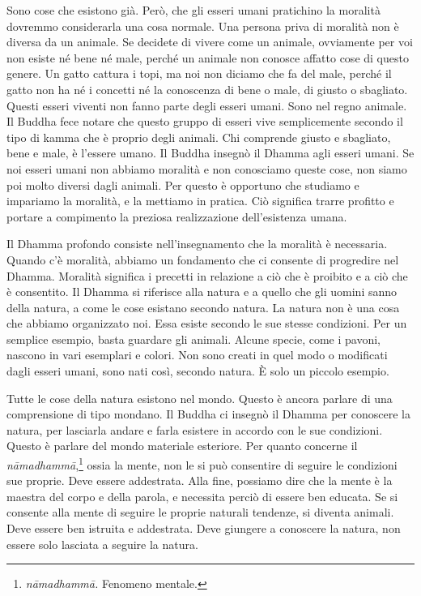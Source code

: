 Sono cose che esistono già. Però, che gli esseri umani pratichino la
moralità dovremmo considerarla una cosa normale. Una persona priva di
moralità non è diversa da un animale. Se decidete di vivere come un
animale, ovviamente per voi non esiste né bene né male, perché un
animale non conosce affatto cose di questo genere. Un gatto cattura i
topi, ma noi non diciamo che fa del male, perché il gatto non ha né i
concetti né la conoscenza di bene o male, di giusto o sbagliato. Questi
esseri viventi non fanno parte degli esseri umani. Sono nel regno
animale. Il Buddha fece notare che questo gruppo di esseri vive
semplicemente secondo il tipo di kamma che è proprio degli
animali. Chi comprende giusto e sbagliato, bene e male, è l'essere
umano. Il Buddha insegnò il Dhamma agli esseri umani. Se noi esseri
umani non abbiamo moralità e non conosciamo queste cose, non siamo poi
molto diversi dagli animali. Per questo è opportuno che studiamo e
impariamo la moralità, e la mettiamo in pratica. Ciò significa trarre
profitto e portare a compimento la preziosa realizzazione dell'esistenza
umana.

Il Dhamma profondo consiste nell'insegnamento che la moralità è
necessaria. Quando c'è moralità, abbiamo un fondamento che ci consente
di progredire nel Dhamma. Moralità significa i precetti in relazione a
ciò che è proibito e a ciò che è consentito. Il Dhamma si riferisce alla
natura e a quello che gli uomini sanno della natura, a come le cose
esistano secondo natura. La natura non è una cosa che abbiamo
organizzato noi. Essa esiste secondo le sue stesse condizioni. Per un
semplice esempio, basta guardare gli animali. Alcune specie, come i
pavoni, nascono in vari esemplari e colori. Non sono creati in quel modo
o modificati dagli esseri umani, sono nati così, secondo natura. È solo
un piccolo esempio.

Tutte le cose della natura esistono nel mondo. Questo è ancora parlare
di una comprensione di tipo mondano. Il Buddha ci insegnò il Dhamma per
conoscere la natura, per lasciarla andare e farla esistere in accordo
con le sue condizioni. Questo è parlare del mondo materiale esteriore.
Per quanto concerne il \emph{nāmadhammā},\footnote{\emph{nāmadhammā.}
  Fenomeno mentale.} ossia la mente, non le si può consentire di seguire
le condizioni sue proprie. Deve essere addestrata. Alla fine, possiamo
dire che la mente è la maestra del corpo e della parola, e necessita
perciò di essere ben educata. Se si consente alla mente di seguire le
proprie naturali tendenze, si diventa animali. Deve essere ben istruita
e addestrata. Deve giungere a conoscere la natura, non essere solo
lasciata a seguire la natura.

